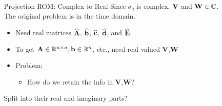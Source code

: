 \begin{frame}{Projection ROM: Complex to Real}
Since \(\sigma_j\) is complex, \({\bf V}\) and \({\bf W} \in \mathbb{C}\).
\\
The original problem is in the time domain.
\bigskip
\begin{itemize}
    \item <1->Need  real matrices $\bf \widehat A$, $\bf \widehat b$, $\bf \widehat c$, $\bf \widehat d$, and $\bf \widehat E$ \\
    \item <1-> To get \({\bf A} \in \mathbb{R}^{n \times n}, {\bf b} \in \mathbb{R}^{n}\), etc., need real valued {\bf V},{\bf W}
\end{itemize}
\bigskip
\begin{itemize}
    \item <1-> Problem:
    \begin{itemize}
        \item How do we retain the info in {\bf V},{\bf W}?
    \end{itemize}
\end{itemize}
\bigskip
Split into their real and imaginary parts?
\end{frame}




